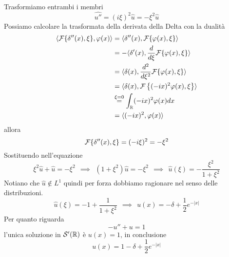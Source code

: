 Trasformiamo entrambi i membri
\begin{equation*}
\widehat{u''} = (i\xi)^{2}\hat{u} = - \xi^{2}\hat{u}
\end{equation*}
Possiamo calcolare la trasformata della derivata della Delta con la dualità
\begin{align*}
\langle \mathcal{F} \{\delta''(x), \xi \}, \varphi (x) \rangle & = \langle \delta''(x), \mathcal{F} \{\varphi (x), \xi \} \rangle \\
 & = - \langle \delta'(x), \frac{d}{d\xi}\mathcal{F} \{\varphi (x), \xi \} \rangle \\
 & = \langle \delta (x), \frac{d^{2}}{d\xi^{2}}\mathcal{F} \{\varphi (x), \xi \} \rangle \\
 & = \langle \delta (x), \mathcal{F} \left\{(- ix)^{2} \varphi (x), \xi \right\} \rangle \\
 & \overset{\xi = 0}{=}\int_{\mathbb{R}}(- ix)^{2} \varphi (x) dx\\
 & = \langle (- ix)^{2}, \varphi (x) \rangle
\end{align*}
allora
\begin{equation*}
\mathcal{F} \{\delta''(x), \xi \} = (- i\xi)^{2} = - \xi^{2}
\end{equation*}
Sostituendo nell'equazione
\begin{equation*}
\xi^{2}\hat{u} + \hat{u} = - \xi^{2} \ \ \implies \ \ \left(1 + \xi^{2}\right)\hat{u} = - \xi^{2} \ \ \implies \ \ \hat{u}(\xi) = - \frac{\xi^{2}}{1 + \xi^{2}}
\end{equation*}
Notiano che $\hat{u} \notin L^{1}$ quindi per forza dobbiamo ragionare nel senso delle distribuzioni.
\begin{equation*}
\hat{u}(\xi) = - 1 + \frac{1}{1 + \xi^{2}} \ \ \implies \ \ u(x) = - \delta + \frac{1}{2} e^{- | x|}
\end{equation*}
Per quanto riguarda
\begin{equation*}
- u'' + u = 1
\end{equation*}
l'unica soluzione in $\mathcal{S}'(\mathbb{R})$ è $u(x) = 1$, in conclusione
\begin{equation*}
u(x) = 1 - \delta + \frac{1}{2} e^{- | x|}
\end{equation*}

\Soluzione

